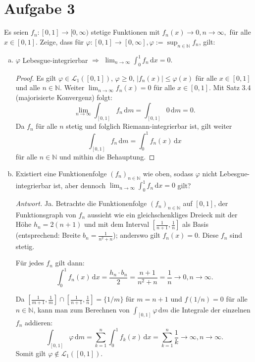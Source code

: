 \documentclass[10pt]{article}\usepackage[]{graphicx}\usepackage[]{color}
\newcommand{\N}{\mathbb{N}}
\newcommand{\df}{\,\textrm{d}}
\begin{document}
\section*{Aufgabe 3}
Es seien $f_n: [0,1] \to [0, \infty)$ stetige Funktionen
mit $f_n(x) \to 0, n \to \infty,$ für alle $x \in [0,1]$.
Zeige, dass für $\varphi: [0,1] \to [0, \infty], \varphi := \sup_{n \in \N} f_n$, gilt:
\begin{enumerate}[(a)]
  \item $\varphi$ Lebesgue-integrierbar $\Rightarrow$ $\lim_{n\to \infty} \int_0^1 f_n \df x = 0.$
  \begin{proof}
  Es gilt $\varphi \in \mathscr{L}_1([0,1])$, $\varphi \geq 0$, $|f_n(x)| \leq \varphi(x)$ für alle $x \in [0,1]$ und alle $n \in \N$. Weiter $\lim_{n \to \infty} f_n(x) = 0$ für alle $x \in [0,1]$. Mit Satz 3.4 (majorisierte Konvergenz) folgt:
  \[
    \lim_{n \to \infty} \int_{[0,1]} f_n \df m = \int_{[0,1]} 0 \df m = 0.
  \]
  Da $f_n$ für alle $n$ stetig und folglich Riemann-integrierbar ist, gilt
  weiter
  \[
    \int_{[0,1]} f_n \df m = \int_0^1 f_n(x) \df x
  \]
  für alle $n \in \N$ und mithin die Behauptung.
  \end{proof}
  
  \item Existiert eine Funktionenfolge $(f_n)_{n \in \N}$
  wie oben, sodass $\varphi$ nicht Lebesgue-integrierbar
  ist, aber dennoch $\lim_{n \to \infty} \int_0^1 f_n \df x = 0$
  gilt?
  
  \textit{Antwort.} Ja. Betrachte die Funktionenfolge
  $(f_n)_{n\in \N}$ auf $[0,1]$, 
  der Funktionsgraph von $f_n$ aussieht wie
  ein gleichschenkliges Dreieck mit der Höhe $h_n = 2(n+1)$
  und mit dem Interval  $\left[\frac{1}{n+1}, \frac{1}{n}\right]$
  als Basis (entsprechend: Breite $b_n = \frac{1}{n^2+n}$);
  anderswo gilt $f_n(x) = 0$.
  Diese $f_n$ sind stetig.
  
  Für jedes $f_n$ gilt dann:
  \[
    \int_0^1 f_n(x) \df x = \frac{h_n\cdot b_n}{2} = \frac{n+1}{n^2+n} = \frac{1}{n} \to 0, n \to \infty.
  \]
  
  Da $\left[\frac{1}{m+1}, \frac{1}{m}\right] \cap \left[\frac{1}{n+1}, \frac{1}{n}\right] = \{1/m\}$ für $m = n + 1$
  und $f(1/n) = 0$ für alle $n \in \N$,
  kann man zum Berechnen von $\int_{[0,1]} \varphi \df m$
  die Integrale der einzelnen $f_n$ addieren:
  \[
    \int_{[0,1]} \varphi \df m = \sum_{k = 1}^{n} \int_0^1 f_k(x) \df x = \sum_{k=1}^{n} \frac{1}{k} \to \infty, n \to \infty.
  \]
  Somit gilt $\varphi \notin \mathscr{L}_1([0,1])$.
\end{enumerate}
\end{document}
